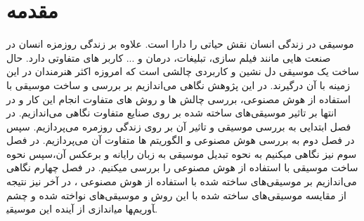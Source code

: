 \chapter{مقدمه}
موسیقی در زندگی انسان نقش حیاتی را دارا است. علاوه بر زندگی روزمزه انسان در صنعت هایی مانند فیلم سازی، تبلیغات، درمان و ... کاربر های متفاوتی دارد. 
حال ساخت یک موسیقی دل نشین و کاربردی چالشی است که امروزه اکثر هنرمندان در این زمینه با آن درگیرند. 
در این پژوهش نگاهی می‌اندازیم بر بررسی و ساخت موسیقی با استفاده از هوش مصنوعی، بررسی چالش ها و روش های متفاوت انجام این کار و در انتها  بر تاثیر موسیقی‌های ساخته شده بر روی صنایع متفاوت نگاهی می‌اندازیم. 
در فصل ابتدایی به بررسی موسیقی و تاثیر آن بر روی زندگی روزمره می‌پردازیم. سپس در فصل دوم به بررسی هوش مصنوعی و الگوریتم ها متفاوت آن می‌پردازیم. در فصل سوم نیز نگاهی میکنیم به نحوه تبدیل موسیقی به زبان رایانه و برعکس آن،سپس نحوه ساخت موسیقی با استفاده از هوش مصنوعی را بررسی میکنیم. در فصل چهارم نگاهی می‌اندازیم بر موسیقی‌های ساخته شده با استفاده از هوش مصنوعی ، در آخر نیز نتیجه از مقایسه موسیقی‌های ساخته شده با این روش و موسیقی‌های نواخته شده و چشم اندازی از آینده این موسیقی‎ها می‎آوریم. 